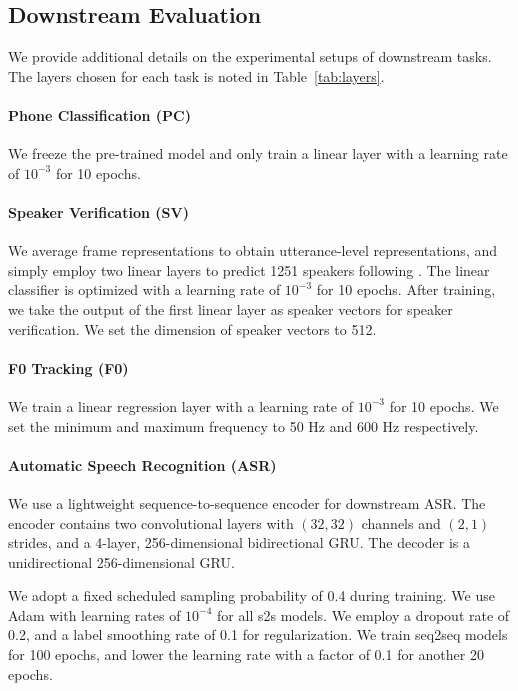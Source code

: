 %
%
%
%
%
%
%
%
%
%
%
%
%
%
%
%
%
%
%
%
%
%
%
%

\subsection{Downstream Evaluation}
\label{appendix:downstream}

We provide additional details on the experimental setups of downstream tasks. 
The layers chosen for each task is noted in Table~\ref{tab:layers}.

\paragraph{Phone Classification (PC)}
We freeze the pre-trained model and only train a linear layer with a learning rate of $10^{-3}$ for 10 epochs.

\paragraph{Speaker Verification (SV)}

We average frame representations to obtain utterance-level representations, and simply
employ two linear layers to predict 1251 speakers following \citep{Fan2020ExploringW2}. 
The linear classifier is optimized with a learning rate of $10^{-3}$ for 10 epochs.
After training, we take the output of the first linear layer as speaker vectors for speaker verification.
We set the dimension of speaker vectors to 512.

\paragraph{F0 Tracking (F0)}
We train a linear regression layer with a learning rate of $10^{-3}$ for 10 epochs.
We set the minimum and maximum frequency to 50 Hz and 600 Hz respectively.

\paragraph{Automatic Speech Recognition (ASR)}

We use a lightweight sequence-to-sequence encoder for downstream ASR.
The encoder contains two convolutional layers with $(32, 32)$ channels and $(2, 1)$ strides,
and a 4-layer, 256-dimensional bidirectional GRU. The decoder is a unidirectional 256-dimensional GRU.

We adopt a fixed scheduled sampling probability of 0.4 during training. 
We use Adam with learning rates of $10^{-4}$ for all s2s models. 
We employ a dropout rate of 0.2, and a label smoothing rate of 0.1 for regularization. 
%
%
%
We train seq2seq models for 100 epochs, 
and lower the learning rate with a factor of 0.1 for another 20 epochs.

%
%
%
%
%

%
%
%
%
%
%

%
%
%
%
%
%
%
%
%
%

%
%
%
%
%
%
%
%
%
%
%
%
%
%
%
%
%
